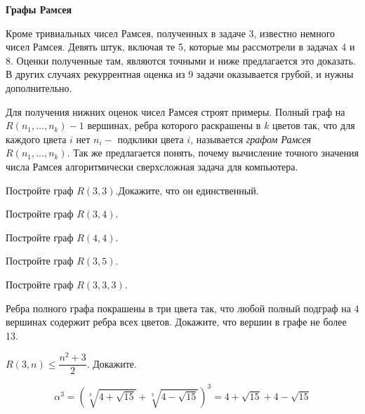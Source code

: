 \centerline{\bf \Huge Графы Рамсея}

Кроме тривиальных чисел Рамсея, полученных в задаче 3, известно немного чисел Рамсея. Девять штук, включая те 5, которые мы рассмотрели в задачах 4 и 8. Оценки полученные там, являются точными и ниже предлагается это доказать. В других случаях рекуррентная оценка из 9 задачи оказывается грубой, и нужны дополнительно. 

Для получения нижних оценок чисел Рамсея строят примеры. Полный граф на $R(n_1, \dots, n_k) - 1$ вершинах, ребра которого раскрашены в $k$ цветов так, что для каждого цвета $i$ нет $n_i-$ подклики цвета $i$, называется \textit{графом Рамсея $R(n_1, \dots, n_k)$}. Так же предлагается понять, почему вычисление точного значения числа Рамсея алгоритмически сверхсложная задача для компьютера. 

 Постройте граф $R(3, 3).$Докажите, что он единственный. 

 Постройте граф $R(3, 4).$

 Постройте граф $R(4, 4).$

 Постройте граф $R(3, 5).$

 Постройте граф $R(3, 3, 3).$

 Ребра полного графа покрашены в три цвета так, что любой полный подграф на 4 вершинах содержит ребра всех цветов. Докажите, что вершин в графе не более 13. 

 $R(3, n) \leq \dfrac{n^2 + 3}{2}$. Докажите.


$$
\alpha^3 =\left(\sqrt[3]{4+\sqrt{15}}+\sqrt[3]{4-\sqrt{15}}\right)^3 = 4 + \sqrt{15} + 4 - \sqrt{15}
$$